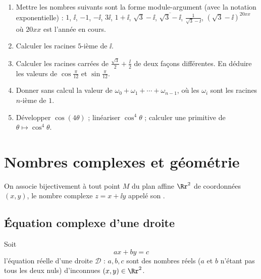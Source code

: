 \documentclass[class=report,crop=false]{standalone}
\begin{document}

\begin{miniexercices}
\sauteligne
\begin{enumerate}
  \item Mettre les nombres suivants sont la forme module-argument (avec la notation exponentielle) :
$1$, $\ii$, $-1$, $-\ii$, $3\ii$, $1+\ii$, $\sqrt{3}-\ii$, $\overline{\sqrt{3}-\ii}$, $\frac{1}{\sqrt{3}-\ii}$, $(\sqrt{3}-\ii)^{20xx}$
où $20xx$ est l'année en cours.
  \item Calculer les racines $5$-ième de $\ii$.
  \item Calculer les racines carrées de $\frac{\sqrt{3}}{2}+\frac{\ii}{2}$ de deux façons différentes.
En déduire les valeurs de $\cos \frac{\pi}{12}$ et $\sin \frac{\pi}{12}$.
  \item Donner sans calcul la valeur de $\omega_0 + \omega_1 + \cdots + \omega_{n-1}$,
où les $\omega_i$ sont les racines $n$-ième de $1$.
  \item Développer $\cos (4\theta)$ ; linéariser $\cos^4 \theta$ ; calculer une primitive de $\theta\mapsto\cos^4 \theta$.
\end{enumerate}
\end{miniexercices}


\section{Nombres complexes et géométrie}

On associe bijectivement à tout point $M$ du plan affine $\Rr^2$
de coordonnées $(x,y)$, le nombre complexe $z=x+\ii y$ appelé son .

\subsection{\'Equation complexe d'une droite}

Soit
$$ax+by=c$$
l'équation réelle d'une droite $\mathcal{D}$ : $a,b,c$ sont des nombres réels
($a$ et $b$ n'étant pas tous les deux nuls) d'inconnues $(x,y) \in \Rr^2$.
\end{document}
